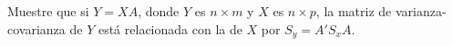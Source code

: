 

\addpoints
\question[10] Muestre que si $Y=XA$, donde $Y$ es $n\times m$ y $X$ es $n \times p$, la matriz de varianza-covarianza de $Y$ está relacionada con la de $X$ por $S_y=A'S_x A$.



